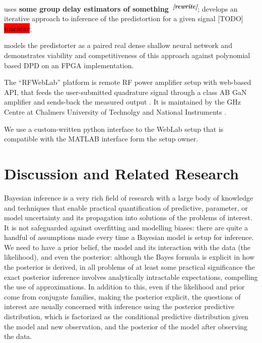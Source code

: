 \documentclass[a4paper,10pt]{article}
\newcommand{\important}[1]{\textbf{\colorbox{red}{#1}}}
\newcommand{\attn}[2]{\textbf{\color{red} #2~\textsuperscript{\textit{[#1]}}}}
\newcommand{\rewrite}[1]{\attn{rewrite}{#1}}
\newcommand{\todo}[1]{{\color{blue} [TODO]} \important{#1}}
\begin{document}
\cite{traverso_low_2019} uses \rewrite{some group delay estimators of something};
\cite{schoukens_obtaining_2017} develops an iterative approach to inference of the predistortion for a given
signal \todo{unclear};

\cite{tarver_design_2019} models the predistorter as a paired real dense shallow neural network and
demonstrates viability and competitiveness of this approach against polynomial based DPD on an
FPGA implementation.

The ``RFWebLab'' platform is remote RF power amplifier setup with web-based API, that feeds
the user-submitted quadrature signal through a class AB GaN amplifier and sends-back the measured
output \cite{dpdcompetiton2018}. It is maintained by the GHz Centre at Chalmers University of
Technolgy and National Instruments \cite{landin_rfweblab_2015}.

We use a custom-written python interface to the WebLab setup that is compatible with the MATLAB
interface form the setup owner.




\section{Discussion and Related Research} %
\label{sec:discussion_and_related_research}

Bayesian inference is a very rich field of research with a large body of knowledge and techniques
that enable practical quantification of predictive, parameter, or model uncertainty and its
propagation into solutions of the problems of interest. It is not safeguarded against overfitting
and modelling biases: there are quite a handful of assumptions made every time a Bayesian model
is setup for inference. We need to have a prior belief, the model and its interaction with
the data (the likelihood), and even the posterior: although the Bayes formula is explicit in
how the posterior is derived, in all problems of at least some practical significance the
exact posterior inference involves analytically intractable expectations, compelling the use
of approximations. In addition to this, even if the likelihood and prior come from conjugate
families, making the posterior explicit, the questions of interest are usually concerned with
inference using the posterior predictive distribution, which is factorized as the conditional
predictive distribution given the model and new observation, and the posterior of the model
after observing the data.
\end{document}
